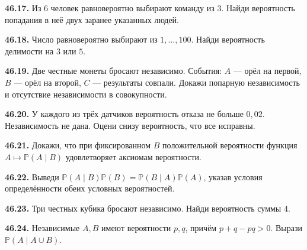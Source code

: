 \noindent\begin{minipage}[t]{\linewidth}\textbf{46.17.} Из \(6\) человек равновероятно выбирают команду из \(3\). Найди вероятность попадания в неё двух заранее указанных людей.\par\end{minipage}\par
\noindent\begin{minipage}[t]{\linewidth}\textbf{46.18.} Число равновероятно выбирают из \(1,\ldots,100\). Найди вероятность делимости на \(3\) или \(5\).\par\end{minipage}\par
\noindent\begin{minipage}[t]{\linewidth}\textbf{46.19.}\starmark{} Две честные монеты бросают независимо. События: \(A\) — орёл на первой, \(B\) — орёл на второй, \(C\) — результаты совпали. Докажи попарную независимость и отсутствие независимости в совокупности.\par\end{minipage}\par
\noindent\begin{minipage}[t]{\linewidth}\textbf{46.20.} У каждого из трёх датчиков вероятность отказа не больше \(0{,}02\). Независимость не дана. Оцени снизу вероятность, что все исправны.\par\end{minipage}\par
\noindent\begin{minipage}[t]{\linewidth}\textbf{46.21.}\starmark{} Докажи, что при фиксированном \(B\) положительной вероятности функция \(A\mapsto\mathbb P(A\mid B)\) удовлетворяет аксиомам вероятности.\par\end{minipage}\par
\noindent\begin{minipage}[t]{\linewidth}\textbf{46.22.} Выведи \(\mathbb P(A\mid B)\mathbb P(B)=\mathbb P(B\mid A)\mathbb P(A)\), указав условия определённости обеих условных вероятностей.\par\end{minipage}\par
\noindent\begin{minipage}[t]{\linewidth}\textbf{46.23.}\starmark{} Три честных кубика бросают независимо. Найди вероятность суммы \(4\).\par\end{minipage}\par
\noindent\begin{minipage}[t]{\linewidth}\textbf{46.24.}\starmark{} Независимые \(A,B\) имеют вероятности \(p,q\), причём \(p+q-pq>0\). Вырази \(\mathbb P(A\mid A\cup B)\).\par\end{minipage}\par
\endgroup
